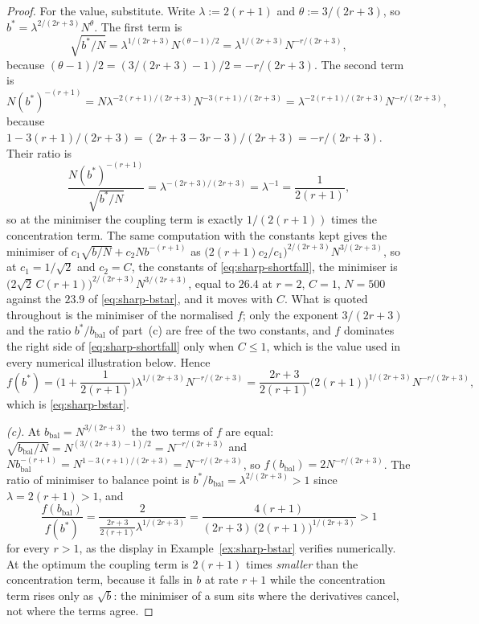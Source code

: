 \documentclass[../../../main.tex]{subfiles}
\begin{document}
\begin{proof}
For the value, substitute. Write $\lambda:=2(r+1)$ and $\theta:=3/(2r+3)$, so $b^*=\lambda^{2/(2r+3)}N^\theta$. The first term is
\[
\sqrt{b^*/N}=\lambda^{1/(2r+3)}N^{(\theta-1)/2}=\lambda^{1/(2r+3)}N^{-r/(2r+3)} ,
\]
because $(\theta-1)/2=(3/(2r+3)-1)/2=-r/(2r+3)$. The second term is
\[
N(b^*)^{-(r+1)}=N\lambda^{-2(r+1)/(2r+3)}N^{-3(r+1)/(2r+3)}=\lambda^{-2(r+1)/(2r+3)}N^{-r/(2r+3)} ,
\]
because $1-3(r+1)/(2r+3)=(2r+3-3r-3)/(2r+3)=-r/(2r+3)$. Their ratio is
\[
\frac{N(b^*)^{-(r+1)}}{\sqrt{b^*/N}}=\lambda^{-(2r+3)/(2r+3)}=\lambda^{-1}=\frac1{2(r+1)} ,
\]
so at the minimiser the coupling term is exactly $1/(2(r+1))$ times the concentration term. The same computation with the constants kept gives the minimiser of $c_1\sqrt{b/N}+c_2Nb^{-(r+1)}$ as $\big(2(r+1)c_2/c_1\big)^{2/(2r+3)}N^{3/(2r+3)}$, so at $c_1=1/\sqrt2$ and $c_2=C$, the constants of \eqref{eq:sharp-shortfall}, the minimiser is $\big(2\sqrt2\,C(r+1)\big)^{2/(2r+3)}N^{3/(2r+3)}$, equal to $26.4$ at $r=2$, $C=1$, $N=500$ against the $23.9$ of \eqref{eq:sharp-bstar}, and it moves with $C$. What is quoted throughout is the minimiser of the normalised $f$; only the exponent $3/(2r+3)$ and the ratio $b^*/b_{\mathrm{bal}}$ of part~(c) are free of the two constants, and $f$ dominates the right side of \eqref{eq:sharp-shortfall} only when $C\le1$, which is the value used in every numerical illustration below. Hence
\[
f(b^*)=\Big(1+\frac1{2(r+1)}\Big)\lambda^{1/(2r+3)}N^{-r/(2r+3)}=\frac{2r+3}{2(r+1)}\big(2(r+1)\big)^{1/(2r+3)}N^{-r/(2r+3)} ,
\]
which is \eqref{eq:sharp-bstar}.

\emph{(c).} At $b_{\mathrm{bal}}=N^{3/(2r+3)}$ the two terms of $f$ are equal: $\sqrt{b_{\mathrm{bal}}/N}=N^{(3/(2r+3)-1)/2}=N^{-r/(2r+3)}$ and $Nb_{\mathrm{bal}}^{-(r+1)}=N^{1-3(r+1)/(2r+3)}=N^{-r/(2r+3)}$, so $f(b_{\mathrm{bal}})=2N^{-r/(2r+3)}$. The ratio of minimiser to balance point is $b^*/b_{\mathrm{bal}}=\lambda^{2/(2r+3)}>1$ since $\lambda=2(r+1)>1$, and
\[
\frac{f(b_{\mathrm{bal}})}{f(b^*)}=\frac{2}{\frac{2r+3}{2(r+1)}\lambda^{1/(2r+3)}}=\frac{4(r+1)}{(2r+3)\,\big(2(r+1)\big)^{1/(2r+3)}}>1
\]
for every $r>1$, as the display in Example~\ref{ex:sharp-bstar} verifies numerically. At the optimum the coupling term is $2(r+1)$ times \emph{smaller} than the concentration term, because it falls in $b$ at rate $r+1$ while the concentration term rises only as $\sqrt b$: the minimiser of a sum sits where the derivatives cancel, not where the terms agree.
\end{proof}
\end{document}
